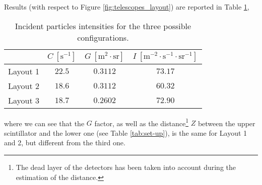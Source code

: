 Results (with respect to Figure \ref{fig:telescopes_layout}) are reported in Table \ref{tab:intensities},
\begin{table}[!htp]
	\centering
	\begin{tabular}{r|ccc}
		\toprule
		& $C \ \left[ \si{\second}^{-1}\right] $ & $G \ \left[ \si{\meter}^{2}\cdot \si{\steradian}\right] $ & $I \ \left[ \si{\meter}^{-2} \cdot \si{\second}^{-1} \cdot \si{\steradian}^{-1}\right] $\\
		\midrule
		Layout 1 & $22.5$ & $0.3112$ & $73.17$\\
		Layout 2 & $18.6$ & $0.3112$ & $60.32$\\ 
		Layout 3 & $18.7$ & $0.2602$ & $72.90$\\
		\bottomrule
	\end{tabular}
	\caption{Incident particles intensities for the three possible configurations.}
	\label{tab:intensities}
\end{table}
where we can see that the $G$ factor, as well as the distance\footnote{The dead layer of the detectors has been taken into account during the estimation of the distance.} $Z$ between the upper scintillator and the lower one (see Table \ref{tab:set-up}), is the same for Layout 1 and 2, but different from the third one.

